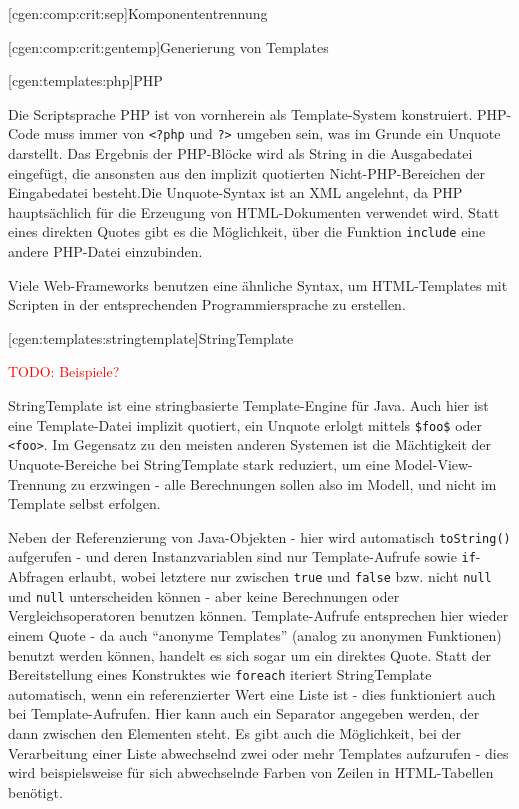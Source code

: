\documentclass[a4paper, bibgerm]{book}
\newcommand\icode[1]{\lstinline?#1?}
\newcommand\phpo{\lstinline+<?php+}
\newcommand\phpc{\lstinline+?>+}
\newcommand{\todo}[1]{
  \textcolor{red}{TODO: #1}
}
\newcommand\lsubsection{}
\newcommand\lsubsubsection{}
\begin{document}
\lsubsubsection[cgen:comp:crit:sep]{Komponententrennung}

\lsubsubsection[cgen:comp:crit:gentemp]{Generierung von Templates}

\lsubsection[cgen:templates:php]{PHP}

Die Scriptsprache PHP ist von vornherein als Template-System
konstruiert. PHP-Code muss immer von \phpo{} und
\phpc{} umgeben sein, was im Grunde ein Unquote darstellt. Das
Ergebnis der PHP-Blöcke wird als String in die Ausgabedatei eingefügt,
die ansonsten aus den implizit quotierten Nicht-PHP-Bereichen der
Eingabedatei besteht.Die Unquote-Syntax ist an
XML angelehnt, da PHP hauptsächlich für die Erzeugung von
HTML-Dokumenten verwendet wird. Statt eines direkten Quotes gibt es die
Möglichkeit, über die Funktion \icode{include} eine andere PHP-Datei
einzubinden.

Viele Web-Frameworks benutzen eine ähnliche Syntax, um HTML-Templates
mit Scripten in der entsprechenden Programmiersprache zu erstellen.

\lsubsection[cgen:templates:stringtemplate]{StringTemplate}

\todo{Beispiele?}

StringTemplate\cite{StringTemplate} ist eine stringbasierte
Template-Engine für Java. Auch hier ist eine Template-Datei implizit
quotiert, ein Unquote erlolgt mittels \icode{$foo$} oder
\icode{<foo>}. Im Gegensatz zu den meisten anderen Systemen ist die
Mächtigkeit der Unquote-Bereiche bei StringTemplate stark reduziert, um
eine Model-View-Trennung zu erzwingen - alle Berechnungen sollen also im
Modell, und nicht im Template selbst erfolgen.

Neben der Referenzierung von Java-Objekten - hier wird automatisch
\icode{toString()} aufgerufen - und deren Instanzvariablen sind nur
Template-Aufrufe sowie \icode{if}-Abfragen erlaubt, wobei letztere nur
zwischen \icode{true} und \icode{false} bzw. nicht \icode{null} und
\icode{null} unterscheiden können - aber keine Berechnungen oder
Vergleichsoperatoren benutzen können. Template-Aufrufe entsprechen hier
wieder einem Quote - da auch "`anonyme Templates"' (analog zu anonymen
Funktionen) benutzt werden können, handelt es sich sogar um ein direktes
Quote. Statt der Bereitstellung eines Konstruktes wie \icode{foreach}
iteriert StringTemplate automatisch, wenn ein referenzierter Wert eine
Liste ist - dies funktioniert auch bei Template-Aufrufen. Hier kann auch
ein Separator angegeben werden, der dann zwischen den Elementen
steht. Es gibt auch die Möglichkeit, bei der Verarbeitung einer Liste
abwechselnd zwei oder mehr Templates aufzurufen - dies wird
beispielsweise für sich abwechselnde Farben von Zeilen in HTML-Tabellen
benötigt.
\end{document}
